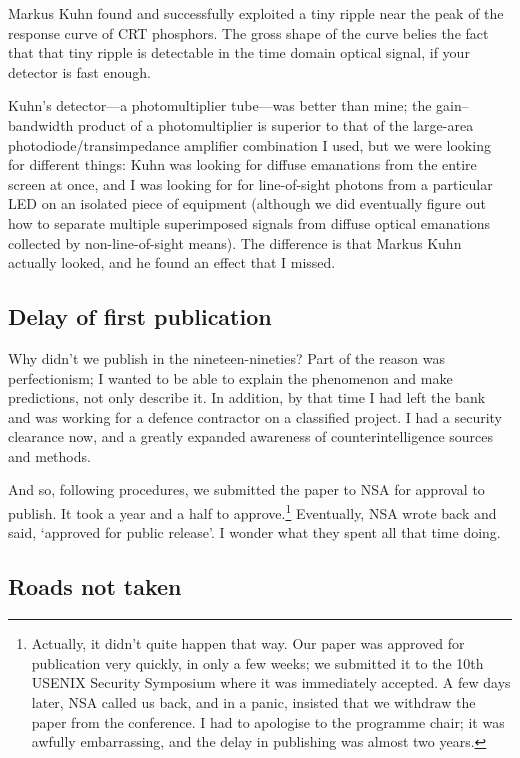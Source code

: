 \documentclass[conference]{IEEEtran}
\begin{document}
Markus Kuhn found and successfully exploited a tiny ripple near the peak of
the response curve of CRT phosphors. The gross shape of the curve belies the
fact that that tiny ripple is detectable in the time domain optical signal,
if your detector is fast enough.

Kuhn's detector---a photomultiplier tube---was better than mine; the
gain--bandwidth product of a photomultiplier is superior to that of the
large-area
photodiode/transimpedance amplifier combination I used, but we were looking
for different things: Kuhn was looking for diffuse emanations from the entire
screen at once, and
I was looking for for line-of-sight photons from a particular LED on an
isolated piece of
equipment (although we did eventually figure out how to separate multiple
superimposed signals from diffuse optical emanations collected by
non-line-of-sight means). The difference is that Markus Kuhn actually looked,
and he found an effect that I missed.

\subsection{Delay of first publication}

Why didn't we publish in the nineteen-nineties? Part of the reason was
perfectionism; I wanted
to be able to explain the phenomenon and make predictions, not only describe
it. In addition, by that time I had left the bank and was working for a
defence contractor on a classified project. I had a security clearance now,
and a greatly expanded awareness of counterintelligence sources and methods.

And so, following procedures, we submitted the paper to NSA for approval to
publish. It took a year and a half to approve.\footnote{Actually, it didn't
quite happen that way. Our paper was approved for publication very quickly,
in only a few weeks; we submitted it to the 10th USENIX Security Symposium
where it was immediately accepted. A few days later, NSA called us back, and
in a panic, insisted that we withdraw the paper from the conference. I had to
apologise to the programme chair; it was awfully embarrassing, and the delay
in publishing was almost two years.} Eventually, NSA wrote back and said,
`approved for public release'. I wonder what they spent all that time doing.

\subsection{Roads not taken}
\end{document}
